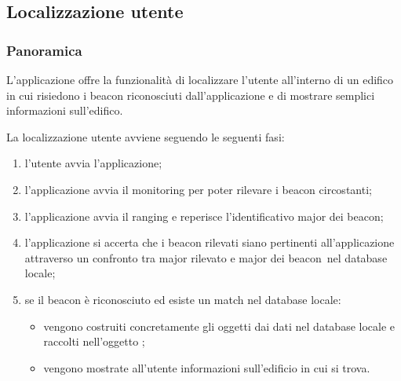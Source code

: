 \documentclass[../Funzionalita.tex]{subfiles}
\begin{document}
\subsection{Localizzazione utente}
\label{subsec:LocalizzazioneUtente}
		
		\subsubsection{Panoramica}
			L'applicazione offre la funzionalità di localizzare l'utente all'interno di un edifico in cui risiedono i \gls{beacon} riconosciuti dall'applicazione e di mostrare semplici informazioni sull'edifico.
			
			La localizzazione utente avviene seguendo le seguenti fasi:
			\begin{enumerate}
				\item l'utente avvia l'applicazione;
				\item l'applicazione avvia il \gls{monitoring} per poter rilevare i \gls{beacon} circostanti;
				\item l'applicazione avvia il \gls{ranging} e reperisce l'identificativo major dei \gls{beacon};
				\item l'applicazione si accerta che i \gls{beacon} rilevati siano pertinenti all'applicazione attraverso un confronto tra major rilevato e major dei \gls{beacon}\ 
nel database locale;
				\item se il \gls{beacon} è riconosciuto ed esiste un match nel database locale:
					\begin{itemize}
						\item vengono costruiti concretamente gli oggetti dai dati nel database locale e raccolti nell'oggetto \BuildingMap;
						\item vengono mostrate all'utente informazioni sull'edificio in cui si trova.
					\end{itemize}
			\end{enumerate}
			
\end{document}
